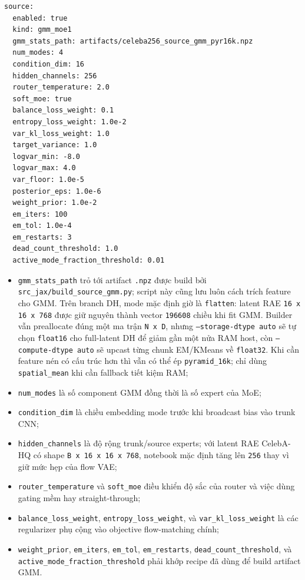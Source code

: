 \begin{lstlisting}[style=rae]
source:
  enabled: true
  kind: gmm_moe1
  gmm_stats_path: artifacts/celeba256_source_gmm_pyr16k.npz
  num_modes: 4
  condition_dim: 16
  hidden_channels: 256
  router_temperature: 2.0
  soft_moe: true
  balance_loss_weight: 0.1
  entropy_loss_weight: 1.0e-2
  var_kl_loss_weight: 1.0
  target_variance: 1.0
  logvar_min: -8.0
  logvar_max: 4.0
  var_floor: 1.0e-5
  posterior_eps: 1.0e-6
  weight_prior: 1.0e-2
  em_iters: 100
  em_tol: 1.0e-4
  em_restarts: 3
  dead_count_threshold: 1.0
  active_mode_fraction_threshold: 0.01
\end{lstlisting}

\begin{itemize}[leftmargin=1.5em]
  \item \texttt{gmm\_stats\_path} trỏ tới artifact \texttt{.npz} được build bởi
  \texttt{src\_jax/build\_source\_gmm.py}; script này cũng lưu luôn cách trích
  feature cho GMM. Trên branch DH, mode mặc định giờ là
  \texttt{flatten}: latent RAE \texttt{16 x 16 x 768} được giữ nguyên thành
  vector \texttt{196608} chiều khi fit GMM. Builder vẫn preallocate đúng một
  ma trận \texttt{N x D}, nhưng \texttt{--storage-dtype auto} sẽ tự chọn
  \texttt{float16} cho full-latent DH để giảm gần một nửa RAM host, còn
  \texttt{--compute-dtype auto} sẽ upcast từng chunk EM/KMeans về
  \texttt{float32}. Khi cần feature nén có cấu trúc hơn thì vẫn có thể ép
  \texttt{pyramid\_16k}; chỉ dùng \texttt{spatial\_mean} khi cần fallback tiết
  kiệm RAM;
  \item \texttt{num\_modes} là số component GMM đồng thời là số expert của MoE;
  \item \texttt{condition\_dim} là chiều embedding mode trước khi broadcast bias
  vào trunk CNN;
  \item \texttt{hidden\_channels} là độ rộng trunk/source experts; với latent
  RAE CelebA-HQ có shape \texttt{B x 16 x 16 x 768}, notebook mặc định tăng lên
  \texttt{256} thay vì giữ mức hẹp của flow VAE;
  \item \texttt{router\_temperature} và \texttt{soft\_moe} điều khiển độ sắc
  của router và việc dùng gating mềm hay straight-through;
  \item \texttt{balance\_loss\_weight}, \texttt{entropy\_loss\_weight}, và
  \texttt{var\_kl\_loss\_weight} là các regularizer phụ cộng vào objective
  flow-matching chính;
  \item \texttt{weight\_prior}, \texttt{em\_iters}, \texttt{em\_tol},
  \texttt{em\_restarts}, \texttt{dead\_count\_threshold}, và
  \texttt{active\_mode\_fraction\_threshold} phải khớp recipe đã dùng để build
  artifact GMM.
\end{itemize}

